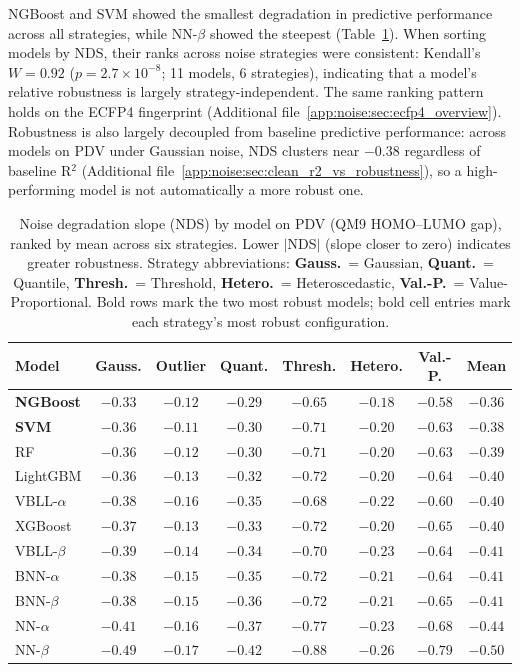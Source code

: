 NGBoost and SVM showed the smallest degradation in predictive performance across all strategies, while NN-$\beta$ showed the steepest (Table~\ref{tab:nds_ranking}). When sorting models by NDS, their ranks across noise strategies were consistent: Kendall's $W = 0.92$ ($p = 2.7 \times 10^{-8}$; 11 models, 6 strategies), indicating that a model's relative robustness is largely strategy-independent. The same ranking pattern holds on the ECFP4 fingerprint (Additional file~\ref{app:noise:sec:ecfp4_overview}). Robustness is also largely decoupled from baseline predictive performance: across models on PDV under Gaussian noise, NDS clusters near $-0.38$ regardless of baseline R$^2$ (Additional file~\ref{app:noise:sec:clean_r2_vs_robustness}), so a high-performing model is not automatically a more robust one.

\begin{table}[htbp]
\centering
\caption{Noise degradation slope (NDS) by model on PDV (QM9 HOMO--LUMO gap), ranked by mean across six strategies. Lower $|$NDS$|$ (slope closer to zero) indicates greater robustness. Strategy abbreviations: \textbf{Gauss.}\ = Gaussian, \textbf{Quant.}\ = Quantile, \textbf{Thresh.}\ = Threshold, \textbf{Hetero.}\ = Heteroscedastic, \textbf{Val.-P.}\ = Value-Proportional. Bold rows mark the two most robust models; bold cell entries mark each strategy's most robust configuration.}
\label{tab:nds_ranking}
\small
\begin{tabular}{lccccccc}
\toprule
\textbf{Model} & \textbf{Gauss.} & \textbf{Outlier} & \textbf{Quant.} & \textbf{Thresh.} & \textbf{Hetero.} & \textbf{Val.-P.} & \textbf{Mean} \\
\midrule
\textbf{NGBoost}    & $\mathbf{-0.33}$ & $-0.12$ & $\mathbf{-0.29}$ & $\mathbf{-0.65}$ & $\mathbf{-0.18}$ & $\mathbf{-0.58}$ & $\mathbf{-0.36}$ \\
\textbf{SVM}        & $-0.36$ & $\mathbf{-0.11}$ & $-0.30$ & $-0.71$ & $-0.20$ & $-0.63$ & $-0.38$ \\
RF                  & $-0.36$ & $-0.12$ & $-0.30$ & $-0.71$ & $-0.20$ & $-0.63$ & $-0.39$ \\
LightGBM            & $-0.36$ & $-0.13$ & $-0.32$ & $-0.72$ & $-0.20$ & $-0.64$ & $-0.40$ \\
VBLL-$\alpha$       & $-0.38$ & $-0.16$ & $-0.35$ & $-0.68$ & $-0.22$ & $-0.60$ & $-0.40$ \\
XGBoost             & $-0.37$ & $-0.13$ & $-0.33$ & $-0.72$ & $-0.20$ & $-0.65$ & $-0.40$ \\
VBLL-$\beta$        & $-0.39$ & $-0.14$ & $-0.34$ & $-0.70$ & $-0.23$ & $-0.64$ & $-0.41$ \\
BNN-$\alpha$        & $-0.38$ & $-0.15$ & $-0.35$ & $-0.72$ & $-0.21$ & $-0.64$ & $-0.41$ \\
BNN-$\beta$         & $-0.38$ & $-0.15$ & $-0.36$ & $-0.72$ & $-0.21$ & $-0.65$ & $-0.41$ \\
NN-$\alpha$         & $-0.41$ & $-0.16$ & $-0.37$ & $-0.77$ & $-0.23$ & $-0.68$ & $-0.44$ \\
NN-$\beta$          & $-0.49$ & $-0.17$ & $-0.42$ & $-0.88$ & $-0.26$ & $-0.79$ & $-0.50$ \\
\bottomrule
\end{tabular}
\end{table}

